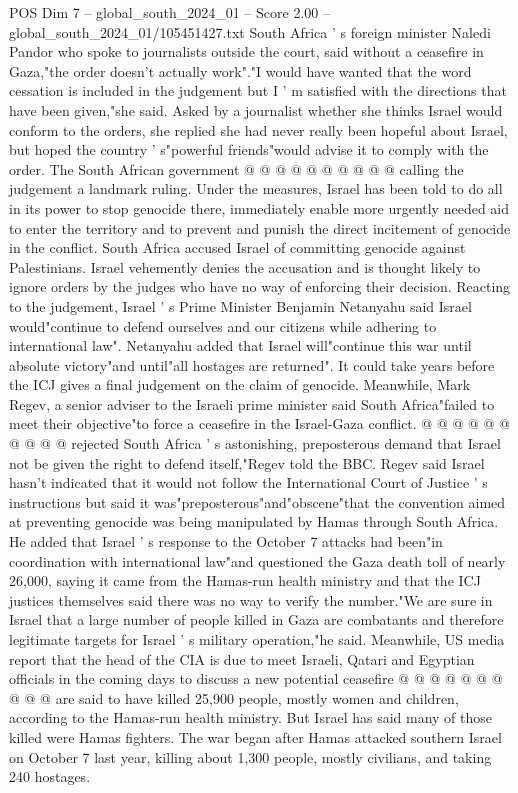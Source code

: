 \begin{textsample}{POS Dim 7 – global\_south\_2024\_01 – Score 2.00 – global\_south\_2024\_01/105451427.txt}
South Africa ' s foreign minister Naledi Pandor who spoke to journalists outside the court, said without a ceasefire in Gaza,"the order doesn't actually work"."I would have wanted that the word cessation is included in the judgement but I ' m satisfied with the directions that have been given,"she said.
Asked by a journalist whether she thinks Israel would conform to the orders, she replied she had never really been hopeful about Israel, but hoped the country ' s"powerful friends"would advise it to comply with the order.
The South African government @ @ @ @ @ @ @ @ @ @ calling the judgement a landmark ruling.
Under the measures, Israel has been told to do all in its power to stop genocide there, immediately enable more urgently needed aid to enter the territory and to prevent and punish the direct incitement of genocide in the conflict.
South Africa accused Israel of committing genocide against Palestinians.
Israel vehemently denies the accusation and is thought likely to ignore orders by the judges who have no way of enforcing their decision.
Reacting to the judgement, Israel ' s Prime Minister Benjamin Netanyahu said Israel would"continue to defend ourselves and our citizens while adhering to international law".
Netanyahu added that Israel will"continue this war until absolute victory"and until"all hostages are returned".
It could take years before the ICJ gives a final judgement on the claim of genocide.
Meanwhile, Mark Regev, a senior adviser to the Israeli prime minister said South Africa"failed to meet their objective"to force a ceasefire in the Israel-Gaza conflict. @ @ @ @ @ @ @ @ @ @ rejected South Africa ' s astonishing, preposterous demand that Israel not be given the right to defend itself,"Regev told the BBC.
Regev said Israel hasn't indicated that it would not follow the International Court of Justice ' s instructions but said it was"preposterous"and"obscene"that the convention aimed at preventing genocide was being manipulated by Hamas through South Africa.
He added that Israel ' s response to the October 7 attacks had been"in coordination with international law"and questioned the Gaza death toll of nearly 26,000, saying it came from the Hamas-run health ministry and that the ICJ justices themselves said there was no way to verify the number."We are sure in Israel that a large number of people killed in Gaza are combatants and therefore legitimate targets for Israel ' s military operation,"he said.
Meanwhile, US media report that the head of the CIA is due to meet Israeli, Qatari and Egyptian officials in the coming days to discuss a new potential ceasefire @ @ @ @ @ @ @ @ @ @ are said to have killed 25,900 people, mostly women and children, according to the Hamas-run health ministry.
But Israel has said many of those killed were Hamas fighters.
The war began after Hamas attacked southern Israel on October 7 last year, killing about 1,300 people, mostly civilians, and taking 240 hostages.

\end{textsample}
